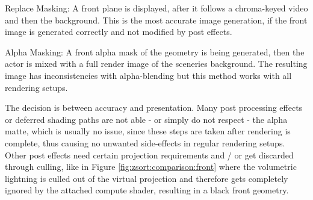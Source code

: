 \begin{my_list}
	\item Replace Masking: A front plane is displayed, after it follows a 
	chroma-keyed video and then the background. This is the most accurate image 
	generation, if the front image is generated correctly and not modified by 
	post effects.
	\item Alpha Masking: A front alpha mask of the geometry is being generated, 
	then the actor is mixed with a full render image of the sceneries 
	background. The resulting image has inconsistencies with alpha-blending but 
	this method works with all rendering setups.
\end{my_list}

The decision is between accuracy and presentation. Many post processing effects 
or deferred shading paths are not able - or simply do not respect - the alpha 
matte, which is usually no issue, since these steps are taken after rendering 
is complete, thus causing no unwanted side-effects in regular rendering setups. 
Other post effects need certain projection requirements and / or get discarded 
through culling, like in Figure \ref{fig:zsort:comparison:front} where the 
volumetric lightning is culled out of the virtual projection and therefore gets 
completely ignored by the attached compute shader, resulting in a black front 
geometry.

